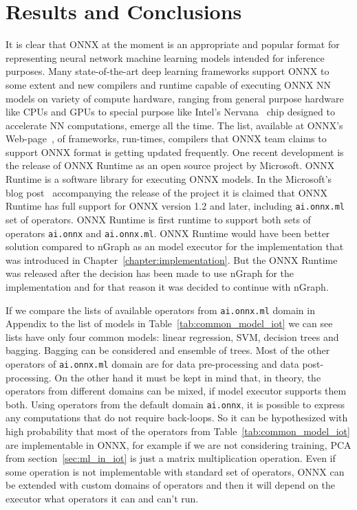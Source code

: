\documentclass[english, 12pt, a4paper, elec, utf8, online]{aaltothesis}
\begin{document}
\section{Results and Conclusions}\label{chaper:results}
It is clear that ONNX at the moment is an appropriate and popular format for representing neural network machine learning models intended for inference purposes. Many state-of-the-art deep learning frameworks support ONNX to some extent and new compilers and runtime capable of executing ONNX NN models on variety of compute hardware, ranging from general purpose hardware like CPUs and GPUs to special purpose like Intel's Nervana~\cite{cyphers2018intel} chip designed to accelerate NN computations, emerge all the time. The list, available at ONNX's Web-page~\cite{onnx_tools}, of frameworks, run-times, compilers that ONNX team claims to support ONNX format is getting updated frequently. One recent development is the release of ONNX Runtime as an open source project by Microsoft. ONNX Runtime is a software library for executing ONNX models. In the Microsoft's blog post~\cite{onnx_runtime} accompanying the release of the project it is claimed that ONNX Runtime has full support for ONNX version 1.2 and later, including \texttt{ai.onnx.ml} set of operators.  
ONNX Runtime is first runtime to support both sets of operators \texttt{ai.onnx} and \texttt{ai.onnx.ml}. ONNX Runtime would have been better solution compared to nGraph as an model executor for the implementation that was introduced in Chapter~\ref{chapter:implementation}. But the ONNX Runtime was released after the decision has been made to use nGraph for the implementation and for that reason it was decided to continue with nGraph.

If we compare the lists of available operators from \texttt{ai.onnx.ml} domain in Appendix to the list of models in Table~\ref{tab:common_model_iot} we can see lists have only four common models: linear regression, SVM, decision trees and bagging. Bagging can be considered and ensemble of trees. Most of the other operators of \texttt{ai.onnx.ml} domain are for data pre-processing and data post-processing. On the  other hand it must be kept in mind that, in theory, the operators from different domains can be mixed, if model executor supports them both. Using operators from the default domain \texttt{ai.onnx}, it is possible to express any computations that do not require back-loops. So it can be hypothesized with high probability that most of the operators from Table~\ref{tab:common_model_iot} are implementable in ONNX, for example if we are not considering training, PCA from section~\ref{sec:ml_in_iot} is just a matrix multiplication operation. Even if some operation is not implementable with standard set of operators, ONNX can be extended with custom domains of operators and then it will depend on the executor what operators it can and can't run. 
\end{document}
